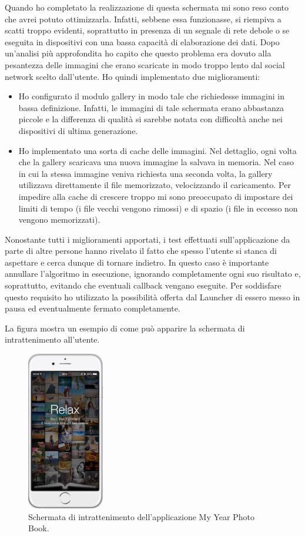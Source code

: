 				Quando ho completato la realizzazione di questa schermata mi sono reso conto che avrei potuto ottimizzarla. Infatti,
				sebbene essa funzionasse, si riempiva a scatti troppo evidenti, soprattutto in presenza di un segnale di rete
				debole o se eseguita in dispositivi con una bassa capacità di elaborazione dei dati. Dopo un'analisi più
				approfondita ho capito che questo problema era dovuto alla pesantezza delle immagini che erano scaricate in modo
				troppo lento dal social network scelto dall'utente. Ho quindi implementato due miglioramenti:
				\begin{itemize}
					\item Ho configurato il modulo gallery in modo tale che richiedesse immagini in bassa definizione. Infatti,
					le immagini di tale schermata erano abbastanza piccole e la differenza di qualità si sarebbe notata con
					difficoltà anche nei dispositivi di ultima generazione.
					\item Ho implementato una sorta di cache delle immagini. Nel dettaglio, ogni volta che la gallery scaricava
					una nuova immagine la salvava in memoria. Nel caso in cui la stessa immagine veniva richiesta una seconda
					volta, la gallery utilizzava direttamente il file memorizzato, velocizzando il caricamento. Per impedire alla
					cache di crescere troppo mi sono preoccupato di impostare dei limiti di tempo (i file vecchi vengono rimossi)
					e di spazio (i file in eccesso non vengono memorizzati).
				\end{itemize}
				Nonostante tutti i miglioramenti apportati, i test effettuati sull'applicazione da parte di altre persone hanno
				rivelato il fatto che spesso l'utente si stanca di aspettare e cerca dunque di tornare indietro. In questo caso
				è importante annullare l'algoritmo in esecuzione, ignorando completamente ogni suo risultato e, soprattutto, evitando
				che eventuali callback vengano eseguite. Per soddisfare questo requisito ho utilizzato la possibilità offerta dal
				Launcher di essero messo in pausa ed eventualmente fermato completamente.
				
				\noindent La figura mostra un esempio di come può apparire la schermata di intrattenimento all'utente.
				\begin{figure}[H]
					\centering
					\includegraphics[width=0.3\textwidth]{capitolo_3/immagini/schermata_di_intrattenimento.png}
					\caption{Schermata di intrattenimento dell'applicazione My Year Photo Book.}
				\end{figure}
